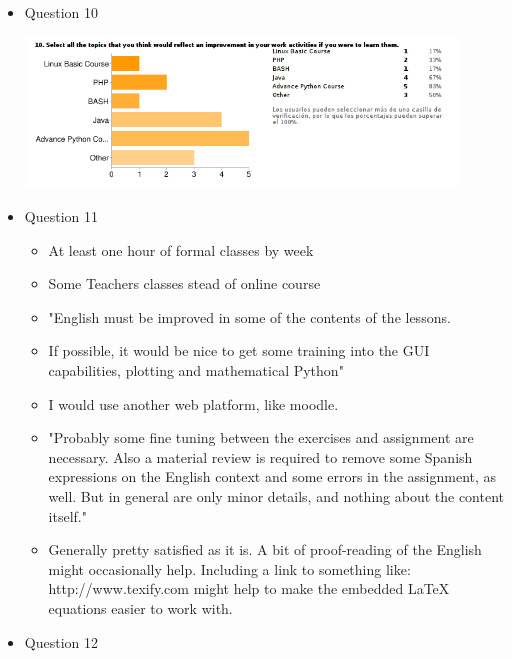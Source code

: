 \documentclass[letter, 10pt]{article}
\begin{document}
\begin{itemize}
    \item Question 10

        \begin{center}
            \includegraphics[width=0.9\textwidth]{img/survey_10.png}
        \end{center}

    \item Question 11

    \begin{itemize}
        \item At least one hour of formal classes by week
        \item Some Teachers classes stead of online course
        \item "English must be improved in some of the contents of the lessons.
        \item If possible, it would be nice to get some training into the GUI capabilities, plotting and mathematical Python"
        \item I would use another web platform, like moodle. 
        \item "Probably some fine tuning between the exercises and assignment are necessary. Also a material review is required to remove some Spanish expressions on the English context and some errors in the assignment, as well. But in general are only minor details, and nothing about the content itself."
        \item Generally pretty satisfied as it is. A bit of proof-reading of the English might occasionally help. Including a link to something like: http://www.texify.com might help to make the embedded LaTeX equations easier to work with. 
    \end{itemize}


    \item Question 12


\end{itemize}
\end{document}
